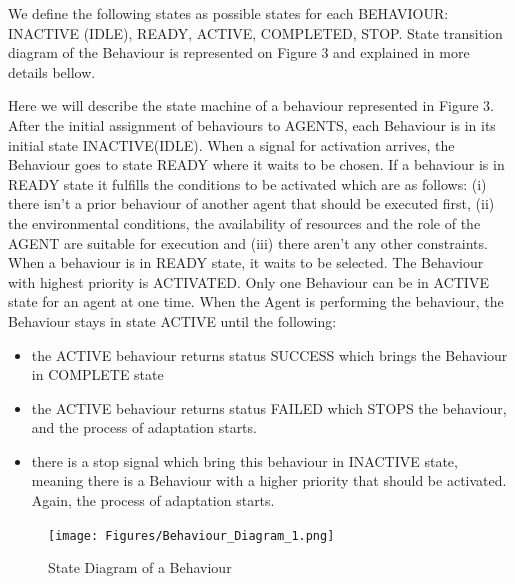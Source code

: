 \documentclass[journal]{IEEEtran}
\theoremstyle{definition}
\begin{document}
We define the following states as possible states for each BEHAVIOUR: INACTIVE (IDLE), READY, ACTIVE, COMPLETED, STOP. State transition diagram of the Behaviour is represented on Figure 3  and explained in more details bellow.

Here we will describe the state machine of a behaviour represented in Figure 3. 
After the initial assignment of behaviours to AGENTS, each Behaviour is in its initial state INACTIVE(IDLE). 
When a signal for activation arrives, the Behaviour goes to state READY where it waits to be chosen.
If a behaviour is in READY state it fulfills the conditions to be activated which are as follows: 
(i) there isn't a prior behaviour of another agent that should be executed first, (ii) the environmental conditions, the availability of resources and the role of the AGENT are suitable for  execution and (iii) there aren't any other constraints. 
When a behaviour is in READY state, it waits to be selected. The Behaviour with highest priority is ACTIVATED. Only one Behaviour can be in ACTIVE state for an agent at one time. When the Agent is performing the behaviour, the Behaviour stays in state ACTIVE until the following:

\begin{itemize}
\item the ACTIVE behaviour returns status SUCCESS which brings the Behaviour in COMPLETE state
\item the ACTIVE behaviour returns status FAILED which STOPS the behaviour, and the process of adaptation starts.
\item there is a stop signal which bring this behaviour in INACTIVE state, meaning there is a Behaviour with a higher priority that should be activated. Again, the process of adaptation starts.
\end{itemize}


\begin{figure}[h]
\texttt{[image: Figures/Behaviour\_Diagram\_1.png]}
\caption{State Diagram of a Behaviour}
\end{figure}
\end{document}
